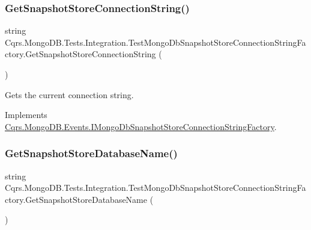 \subsubsection{\texorpdfstring{Get\+Snapshot\+Store\+Connection\+String()}{GetSnapshotStoreConnectionString()}}
{\footnotesize\ttfamily string Cqrs.\+Mongo\+D\+B.\+Tests.\+Integration.\+Test\+Mongo\+Db\+Snapshot\+Store\+Connection\+String\+Factory.\+Get\+Snapshot\+Store\+Connection\+String (\begin{DoxyParamCaption}{ }\end{DoxyParamCaption})}



Gets the current connection string. 



Implements \hyperlink{interfaceCqrs_1_1MongoDB_1_1Events_1_1IMongoDbSnapshotStoreConnectionStringFactory_a634bf6d5d35873cde881588a4ea5f546_a634bf6d5d35873cde881588a4ea5f546}{Cqrs.\+Mongo\+D\+B.\+Events.\+I\+Mongo\+Db\+Snapshot\+Store\+Connection\+String\+Factory}.

\mbox{\label{classCqrs_1_1MongoDB_1_1Tests_1_1Integration_1_1TestMongoDbSnapshotStoreConnectionStringFactory_aec64598d970898309a086123b7867ab3_aec64598d970898309a086123b7867ab3}} 
\subsubsection{\texorpdfstring{Get\+Snapshot\+Store\+Database\+Name()}{GetSnapshotStoreDatabaseName()}}
{\footnotesize\ttfamily string Cqrs.\+Mongo\+D\+B.\+Tests.\+Integration.\+Test\+Mongo\+Db\+Snapshot\+Store\+Connection\+String\+Factory.\+Get\+Snapshot\+Store\+Database\+Name (\begin{DoxyParamCaption}{ }\end{DoxyParamCaption})}



